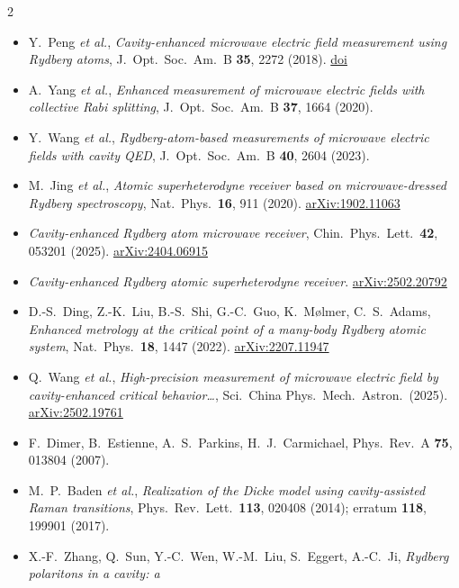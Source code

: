 \documentclass[10pt,a4paper,landscape]{article}
\begin{document}
{\scriptsize
\begin{multicols}{2}
\begin{itemize}[leftmargin=1.1em,itemsep=0pt,parsep=0pt,label={}]
\item Y.~Peng \emph{et al.}, \emph{Cavity-enhanced microwave electric field measurement using Rydberg atoms},
      J.~Opt.~Soc.~Am.~B \textbf{35}, 2272 (2018). \href{https://doi.org/10.1364/JOSAB.35.002272}{doi}
\item A.~Yang \emph{et al.}, \emph{Enhanced measurement of microwave electric fields with collective Rabi
      splitting}, J.~Opt.~Soc.~Am.~B \textbf{37}, 1664 (2020).
\item Y.~Wang \emph{et al.}, \emph{Rydberg-atom-based measurements of microwave electric fields with cavity QED},
      J.~Opt.~Soc.~Am.~B \textbf{40}, 2604 (2023).
\item M.~Jing \emph{et al.}, \emph{Atomic superheterodyne receiver based on microwave-dressed Rydberg
      spectroscopy}, Nat.~Phys.~\textbf{16}, 911 (2020). \href{https://arxiv.org/abs/1902.11063}{arXiv:1902.11063}
\item \emph{Cavity-enhanced Rydberg atom microwave receiver}, Chin.~Phys.~Lett.~\textbf{42}, 053201 (2025).
      \href{https://arxiv.org/abs/2404.06915}{arXiv:2404.06915}
\item \emph{Cavity-enhanced Rydberg atomic superheterodyne receiver}.
      \href{https://arxiv.org/abs/2502.20792}{arXiv:2502.20792}
\item D.-S.~Ding, Z.-K.~Liu, B.-S.~Shi, G.-C.~Guo, K.~M\o{}lmer, C.~S.~Adams, \emph{Enhanced metrology at the
      critical point of a many-body Rydberg atomic system}, Nat.~Phys.~\textbf{18}, 1447 (2022).
      \href{https://arxiv.org/abs/2207.11947}{arXiv:2207.11947}
\item Q.~Wang \emph{et al.}, \emph{High-precision measurement of microwave electric field by cavity-enhanced
      critical behavior\ldots}, Sci.~China Phys.~Mech.~Astron.~(2025).
      \href{https://arxiv.org/abs/2502.19761}{arXiv:2502.19761}
\item F.~Dimer, B.~Estienne, A.~S.~Parkins, H.~J.~Carmichael, Phys.~Rev.~A \textbf{75}, 013804 (2007).
\item M.~P.~Baden \emph{et al.}, \emph{Realization of the Dicke model using cavity-assisted Raman transitions},
      Phys.~Rev.~Lett.~\textbf{113}, 020408 (2014); erratum \textbf{118}, 199901 (2017).
\item X.-F.~Zhang, Q.~Sun, Y.-C.~Wen, W.-M.~Liu, S.~Eggert, A.-C.~Ji, \emph{Rydberg polaritons in a cavity: a
}
\end{itemize}
\end{multicols}}
\end{document}
